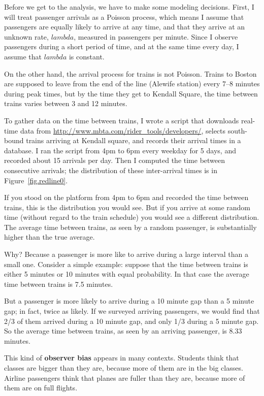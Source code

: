 \documentclass[12pt]{book}
\begin{document}
Before we get to the analysis, we have to make some
modeling decisions.  First, I will treat passenger arrivals as
a Poisson process, which means I assume that passengers are equally
likely to arrive at any time, and that they arrive at an unknown
rate, $lambda$, measured in passengers per minute.  Since I
observe passengers during a short period of time, and at the same
time every day, I assume that $lambda$ is constant.

On the other hand, the arrival process for trains is not Poisson.
Trains to Boston are supposed to leave from the end of the line
(Alewife station) every 7--8 minutes during peak times, but by the time
they get to Kendall Square, the time between trains varies between 3
and 12 minutes.

To gather data on the time between trains, I wrote a script that
downloads real-time data from
\url{http://www.mbta.com/rider_tools/developers/}, selects south-bound
trains arriving at Kendall square, and records their arrival times
in a database.  I ran the script from 4pm to 6pm every weekday
for 5 days, and recorded about 15 arrivals per day.  Then
I computed the time between consecutive arrivals; the distribution
of these inter-arrival times is in Figure~\ref{fig.redline0}.

If you stood on the platform from 4pm to 6pm and recorded the time
between trains, this is the distribution you would see.  But if you
arrive at some random time (without regard to the train schedule) you
would see a different distribution.  The average time
between trains, as seen by a random passenger, is substantially
higher than the true average.

Why?  Because a passenger is more like to arrive during a
large interval than a small one.  Consider a simple example:
suppose that the time between trains is either 5 minutes
or 10 minutes with equal probability.  In that case
the average time between
trains is 7.5 minutes.

But a passenger is more likely to arrive during a 10 minute gap 
than a 5 minute gap; in fact, twice as likely.  If we surveyed
arriving passengers, we would find that 2/3 of them arrived during
a 10 minute gap, and only 1/3 during a 5 minute gap.  So the
average time between trains, as seen by an arriving passenger,
is 8.33 minutes.

This kind of {\bf observer bias} appears in many contexts.  Students
think that classes are bigger than they are, because more of them are
in the big classes.  Airline passengers think that planes are fuller
than they are, because more of them are on full flights.
\end{document}
